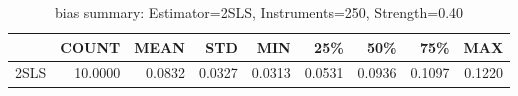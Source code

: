 \begin{table}[ht]
\centering
\caption{bias summary: Estimator=2SLS, Instruments=250, Strength=0.40}
\begin{tabular}{lrrrrrrrr}
\toprule
 & COUNT & MEAN & STD & MIN & 25\% & 50\% & 75\% & MAX \\
\midrule
2SLS & 10.0000 & 0.0832 & 0.0327 & 0.0313 & 0.0531 & 0.0936 & 0.1097 & 0.1220 \\
\bottomrule
\end{tabular}
\end{table}
